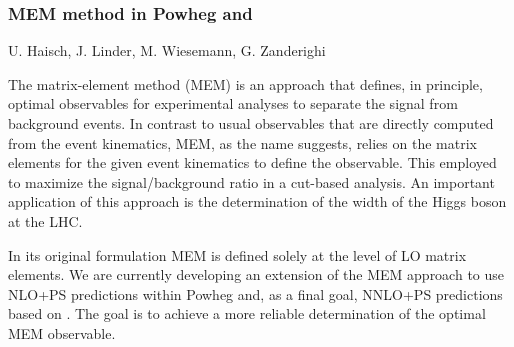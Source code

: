\documentclass{FBR_Bericht_2025}
\begin{document}
\begin{refsection}
\subsubsection{MEM method in Powheg and \minnlo{}}
\begin{Namen}
U. Haisch, J. Linder, M. Wiesemann, G. Zanderighi
\end{Namen}
%
The matrix-element method (MEM) is an approach that defines, in principle, optimal observables
for experimental analyses to separate the signal from background events. In contrast to usual 
observables that are directly computed from the event kinematics, MEM, as the name suggests, 
relies on the matrix elements for the given event kinematics to define the observable. This employed
to maximize the signal/background ratio in a cut-based analysis. An important application of this
approach is the determination of the width of the Higgs boson at the LHC.

In its original formulation MEM is defined solely at the level of LO matrix elements. We are currently
developing an extension of the MEM approach to use NLO+PS predictions within Powheg and,
as a final goal, NNLO+PS predictions based on \minnlo{}. The goal is to achieve a more reliable
determination of the optimal MEM observable.
%

\end{refsection}
\end{document}

